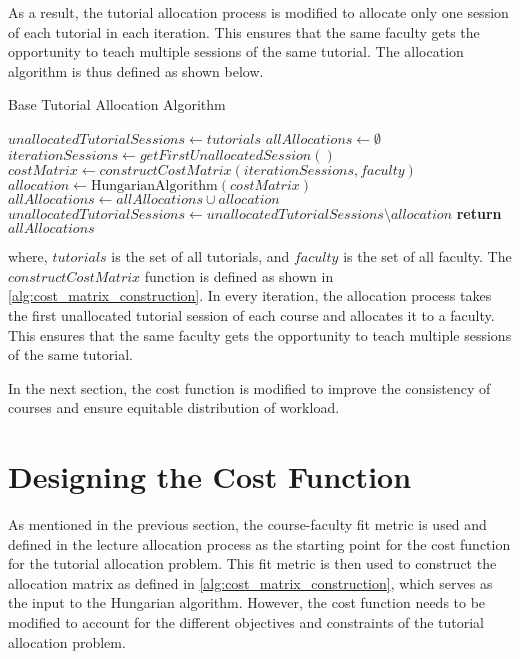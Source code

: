 As a result, the tutorial allocation process is modified to allocate only one session of each tutorial in each iteration. This ensures that the same faculty gets the opportunity to teach multiple sessions of the same tutorial. The allocation algorithm is thus defined as shown below.

\begin{algorithm}[H]
  \caption*{Base Tutorial Allocation Algorithm}
  \begin{algorithmic}
    \State $unallocatedTutorialSessions \gets tutorials$
    \State $allAllocations \gets \emptyset$
    \State $iterationSessions \gets getFirstUnallocatedSession()$
    \State $costMatrix \gets constructCostMatrix(iterationSessions, faculty)$
    \State $allocation \gets \text{HungarianAlgorithm}(costMatrix)$
    \State $allAllocations \gets allAllocations \cup allocation$
    \State $unallocatedTutorialSessions \gets unallocatedTutorialSessions \setminus allocation$
    \EndWhile
    \State \textbf{return} $allAllocations$
    \EndProcedure
  \end{algorithmic}
\end{algorithm}

where, $tutorials$ is the set of all tutorials, and $faculty$ is the set of all faculty. The $constructCostMatrix$ function is defined as shown in \autoref{alg:cost_matrix_construction}. In every iteration, the allocation process takes the first unallocated tutorial session of each course and allocates it to a faculty. This ensures that the same faculty gets the opportunity to teach multiple sessions of the same tutorial.

In the next section, the cost function is modified to improve the consistency of courses and ensure equitable distribution of workload.

\section{Designing the Cost Function}

As mentioned in the previous section, the course-faculty fit metric is used and defined in the lecture allocation process as the starting point for the cost function for the tutorial allocation problem. This fit metric is then used to construct the allocation matrix as defined in \autoref{alg:cost_matrix_construction}, which serves as the input to the Hungarian algorithm. However, the cost function needs to be modified to account for the different objectives and constraints of the tutorial allocation problem.

